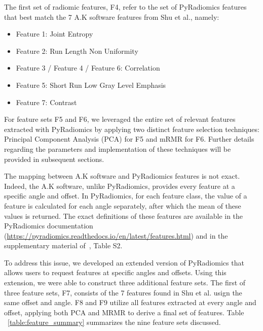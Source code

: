 The first set of radiomic features, F4, refer to the set of PyRadiomics features that best match the 7 A.K software features from Shu et al., namely:

\begin{itemize}
    \item Feature 1: Joint Entropy
    \item Feature 2: Run Length Non Uniformity
    \item Feature 3 / Feature 4 / Feature 6: Correlation
    \item Feature 5: Short Run Low Gray Level Emphasis
    \item Feature 7: Contrast
\end{itemize}

For feature sets F5 and F6, we leveraged the entire set of relevant features extracted with PyRadiomics by applying two distinct feature selection techniques: Principal Component Analysis (PCA) for F5 and mRMR for F6. Further details regarding the parameters and implementation of these techniques will be provided in subsequent sections.

The mapping between A.K software and PyRadiomics features is not exact. Indeed, the A.K software, unlike PyRadiomics, provides every feature at a specific angle and offset. In PyRadiomics, for each feature class, the value of a feature is calculated for each angle separately, after which the mean of these values is returned. The exact definitions of these features are available in the PyRadiomics documentation (\url{https://pyradiomics.readthedocs.io/en/latest/features.html}) and in the supplementary material of~\cite{shu2021predicting}, Table S2. 

To address this issue, we developed an extended version of PyRadiomics that allows users to request features at specific angles and offsets. Using this extension, we were able to construct three additional feature sets. The first of three feature sets, F7, consists of the 7 features found in Shu et al. usign the same offset and angle. F8 and F9 utilize all features extracted at every angle and offset, applying both PCA and MRMR to derive a final set of features. Table ~\ref{table:feature_summary} summarizes the nine feature sets discussed.

